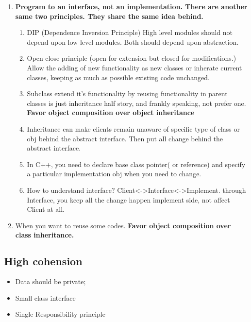 \documentclass[a4paper,12pt,twoside]{book}
\begin{document}
\begin{itemize}
\begin{enumerate}
\begin{enumerate}
\end{enumerate}

\item \textbf{Program to an interface, not an implementation. There are another same two principles. They share the same idea behind. }
\begin{enumerate}
\item DIP (Dependence Inversion Principle) High level modules should not depend upon low level modules. Both should depend upon abstraction. 
\item Open close principle (open for extension but closed for modifications.) Allow the adding of new functionality as new classes or inherate current classes, keeping as much as possible existing code unchanged.

\item Subclass extend it's functionality by reusing functionality in parent classes is just inheritance half story, and frankly speaking, not prefer one. \textbf{Favor object composition over object inheritance}

\item Inheritance can make clients remain unaware of specific type of class or obj behind the abstract interface. Then put all change behind the abstract interface. 

\item In C++, you need to declare base class pointer( or reference) and specify a particular implementation obj when you need to change. 

\item How to understand interface? Client<->Interface<->Implement. through Interface, you keep all the change happen implement side, not affect Client at all. 

\end{enumerate}

\item When you want to reuse some codes. \textbf{Favor object composition over class inheritance. }
\end{enumerate}

\end{itemize}

\subsection{High cohension}
\begin{itemize}
\item Data should be private;
\item Small class interface
\item Single Responsibility principle
\end{itemize}
\end{document}
